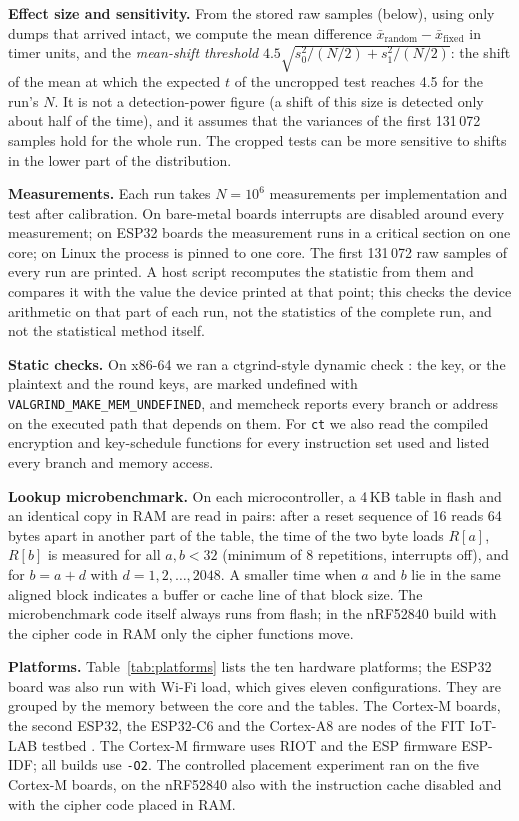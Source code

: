 \documentclass[11pt, a4paper, twoside, reqno]{article}
\newcommand{\tct}{\texttt{ct}}
\begin{document}
\textbf{Effect size and sensitivity.} From the stored raw samples (below), using only dumps that arrived intact, we compute the mean difference $\bar x_{\mathrm{random}}-\bar x_{\mathrm{fixed}}$ in timer units, and the \emph{mean-shift threshold} $4.5\sqrt{s_0^2/(N/2)+s_1^2/(N/2)}$: the shift of the mean at which the expected $t$ of the uncropped test reaches 4.5 for the run's $N$. It is not a detection-power figure (a shift of this size is detected only about half of the time), and it assumes that the variances of the first 131\,072 samples hold for the whole run. The cropped tests can be more sensitive to shifts in the lower part of the distribution.

\textbf{Measurements.} Each run takes $N=10^6$ measurements per implementation and test after calibration. On bare-metal boards interrupts are disabled around every measurement; on ESP32 boards the measurement runs in a critical section on one core; on Linux the process is pinned to one core. The first 131\,072 raw samples of every run are printed. A host script recomputes the statistic from them and compares it with the value the device printed at that point; this checks the device arithmetic on that part of each run, not the statistics of the complete run, and not the statistical method itself.

\textbf{Static checks.} On x86-64 we ran a ctgrind-style dynamic check \citep{langley2010}: the key, or the plaintext and the round keys, are marked undefined with \texttt{VALGRIND\_MAKE\_MEM\_UNDEFINED}, and memcheck reports every branch or address on the executed path that depends on them. For \tct{} we also read the compiled encryption and key-schedule functions for every instruction set used and listed every branch and memory access.

\textbf{Lookup microbenchmark.} On each microcontroller, a 4\,KB table in flash and an identical copy in RAM are read in pairs: after a reset sequence of 16 reads 64 bytes apart in another part of the table, the time of the two byte loads $R[a]$, $R[b]$ is measured for all $a,b<32$ (minimum of 8 repetitions, interrupts off), and for $b=a+d$ with $d=1,2,\dots,2048$. A smaller time when $a$ and $b$ lie in the same aligned block indicates a buffer or cache line of that block size. The microbenchmark code itself always runs from flash; in the nRF52840 build with the cipher code in RAM only the cipher functions move.

\textbf{Platforms.} Table~\ref{tab:platforms} lists the ten hardware platforms; the ESP32 board was also run with Wi-Fi load, which gives eleven configurations. They are grouped by the memory between the core and the tables. The Cortex-M boards, the second ESP32, the ESP32-C6 and the Cortex-A8 are nodes of the FIT IoT-LAB testbed \citep{adjih2015}. The Cortex-M firmware uses RIOT \citep{baccelli2018} and the ESP firmware ESP-IDF; all builds use \texttt{-O2}. The controlled placement experiment ran on the five Cortex-M boards, on the nRF52840 also with the instruction cache disabled and with the cipher code placed in RAM.
\end{document}
